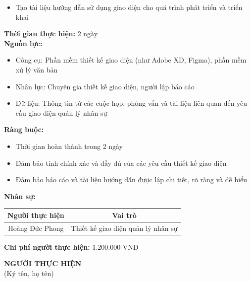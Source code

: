 {\begin{minipage}{\textwidth}
\begin{itemize}
        \item Tạo tài liệu hướng dẫn sử dụng giao diện cho quá trình phát triển và triển khai
    \end{itemize}
    \vspace{0.5cm}
    \noindent \textbf{Thời gian thực hiện:} 2 ngày \\
    \noindent \textbf{Nguồn lực:}
    \begin{itemize}
        \item Công cụ: Phần mềm thiết kế giao diện (như Adobe XD, Figma), phần mềm xử lý văn bản
        \item Nhân lực: Chuyên gia thiết kế giao diện, người lập báo cáo
        \item Dữ liệu: Thông tin từ các cuộc họp, phỏng vấn và tài liệu liên quan đến yêu cầu giao diện quản lý nhân sự
    \end{itemize}
    \vspace{0.5cm}
    \noindent \textbf{Ràng buộc:}
    \begin{itemize}
        \item Thời gian hoàn thành trong 2 ngày
        \item Đảm bảo tính chính xác và đầy đủ của các yêu cầu thiết kế giao diện
        \item Đảm bảo báo cáo và tài liệu hướng dẫn được lập chi tiết, rõ ràng và dễ hiểu
    \end{itemize}
    \vspace{0.5cm}
    \noindent \textbf{Nhân sự:}
    \begin{longtable}{|c|c|}
    \hline
    \textbf{Người thực hiện} & \textbf{Vai trò} \\
    \hline
    Hoàng Đức Phong & Thiết kế giao diện quản lý nhân sự \\
    \hline
    \end{longtable}
    \vspace{0.5cm}
    \noindent \textbf{Chi phí người thực hiện:} 1.200.000 VNĐ
    \vspace{1cm}
    \begin{flushleft}
        \hspace{8cm} \textbf{NGƯỜI THỰC HIỆN} \\
        \hspace{8.8cm} (Ký tên, họ tên) \\
        \vspace{1cm}
    \end{flushleft}
    \end{minipage}
}
% 
